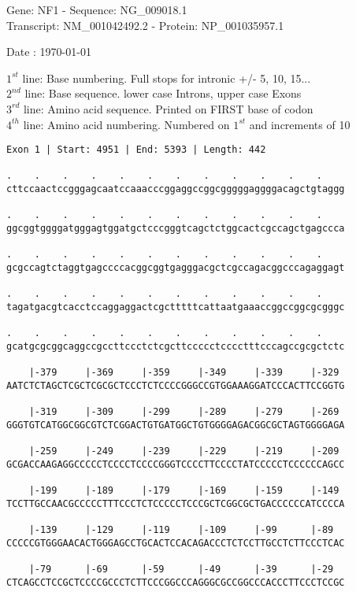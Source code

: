 \documentclass{article}
\begin{document}
\begin{center}
\begin{large}
Gene: NF1 - Sequence: NG\_009018.1\\
Transcript: NM\_001042492.2 - Protein: NP\_001035957.1
 
 Date : \today
\end{large}
\end{center}
$1^{st}$ line: Base numbering. Full stops for intronic +/- 5, 10, 15...\\
$2^{nd}$ line: Base sequence. lower case Introns, upper case Exons\\
$3^{rd}$ line: Amino acid sequence. Printed on FIRST base of codon\\
$4^{th}$ line: Amino acid numbering. Numbered on $1^{st}$ and increments of 10\\
\begin{Verbatim}[fontfamily=courier]
Exon 1 | Start: 4951 | End: 5393 | Length: 442

.    .    .    .    .    .    .    .    .    .    .    .    
cttccaactccgggagcaatccaaacccggaggccggcgggggaggggacagctgtaggg

.    .    .    .    .    .    .    .    .    .    .    .    
ggcggtggggatgggagtggatgctcccgggtcagctctggcactcgccagctgagccca

.    .    .    .    .    .    .    .    .    .    .    .    
gcgccagtctaggtgagccccacggcggtgagggacgctcgccagacggcccagaggagt

.    .    .    .    .    .    .    .    .    .    .    .    
tagatgacgtcacctccaggaggactcgctttttcattaatgaaaccggccggcgcgggc

.    .    .    .    .    .    .    .    .    .    .    .    
gcatgcgcggcaggccgccttccctctcgcttccccctcccctttcccagccgcgctctc

    |-379     |-369     |-359     |-349     |-339     |-329 
AATCTCTAGCTCGCTCGCGCTCCCTCTCCCCGGGCCGTGGAAAGGATCCCACTTCCGGTG

    |-319     |-309     |-299     |-289     |-279     |-269 
GGGTGTCATGGCGGCGTCTCGGACTGTGATGGCTGTGGGGAGACGGCGCTAGTGGGGAGA

    |-259     |-249     |-239     |-229     |-219     |-209 
GCGACCAAGAGGCCCCCTCCCCTCCCCGGGTCCCCTTCCCCTATCCCCCTCCCCCCAGCC

    |-199     |-189     |-179     |-169     |-159     |-149 
TCCTTGCCAACGCCCCCTTTCCCTCTCCCCCTCCCGCTCGGCGCTGACCCCCCATCCCCA

    |-139     |-129     |-119     |-109     |-99      |-89  
CCCCCGTGGGAACACTGGGAGCCTGCACTCCACAGACCCTCTCCTTGCCTCTTCCCTCAC

    |-79      |-69      |-59      |-49      |-39      |-29  
CTCAGCCTCCGCTCCCCGCCCTCTTCCCGGCCCAGGGCGCCGGCCCACCCTTCCCTCCGC

\end{Verbatim}
\end{document}
